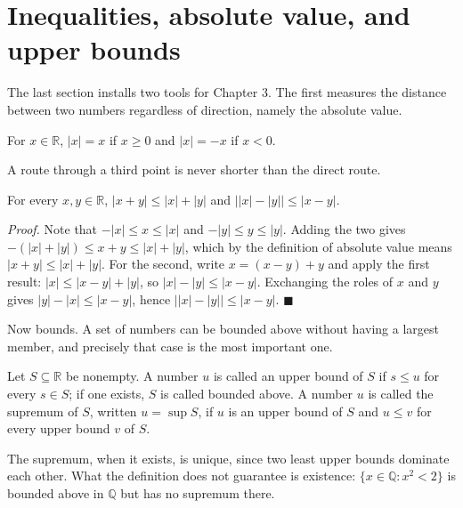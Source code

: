 \section{Inequalities, absolute value, and upper bounds}

The last section installs two tools for Chapter 3. The first measures the distance
between two numbers regardless of direction, namely the absolute value.

\begin{definisi}
For $x \in \mathbb{R}$, $|x| = x$ if $x \ge 0$ and $|x| = -x$ if $x < 0$.
\end{definisi}

A route through a third point is never shorter than the direct route.

\begin{proposisi}
For every $x, y \in \mathbb{R}$, $|x + y| \le |x| + |y|$ and
$\bigl| |x| - |y| \bigr| \le |x - y|$.
\end{proposisi}
\par\smallskip\noindent\textit{Proof.} Note that $-|x| \le x \le |x|$ and
$-|y| \le y \le |y|$. Adding the two gives
$-(|x|+|y|) \le x + y \le |x|+|y|$, which by the definition of absolute value means
$|x+y| \le |x|+|y|$. For the second, write $x = (x-y) + y$ and apply the first result:
$|x| \le |x-y| + |y|$, so $|x| - |y| \le |x-y|$. Exchanging the roles of $x$ and $y$
gives $|y| - |x| \le |x-y|$, hence $\bigl| |x| - |y| \bigr| \le |x-y|$.
\hfill$\blacksquare${\parfillskip=0pt\par}

Now bounds. A set of numbers can be bounded above without having a largest member, and
precisely that case is the most important one.

\begin{definisi}
Let $S \subseteq \mathbb{R}$ be nonempty. A number $u$ is called an upper bound of $S$
if $s \le u$ for every $s \in S$; if one exists, $S$ is called bounded above. A number
$u$ is called the supremum of $S$, written $u = \sup S$, if $u$ is an upper bound of
$S$ and $u \le v$ for every upper bound $v$ of $S$.
\end{definisi}


The supremum, when it exists, is unique, since two least upper bounds dominate each
other. What the definition does not guarantee is existence:
$\{x \in \mathbb{Q} : x^{2} < 2\}$ is bounded above in $\mathbb{Q}$ but has no
supremum there.

